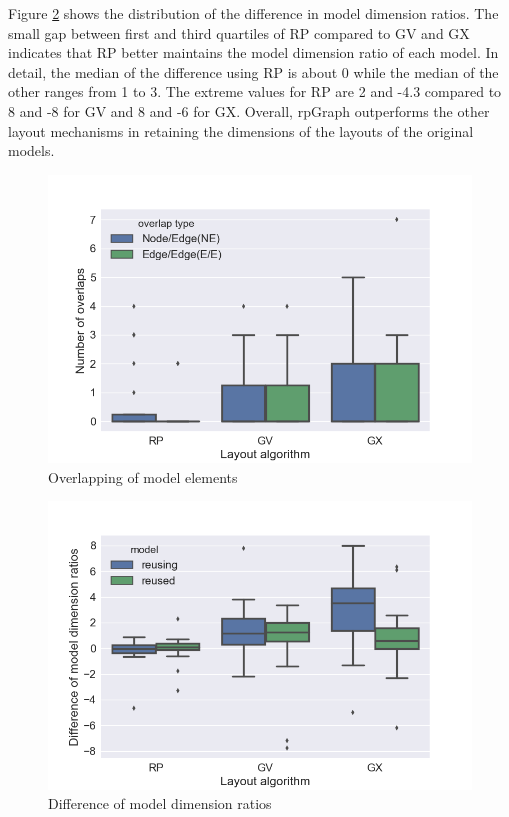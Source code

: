 Figure \ref{fig : relative dimension} shows the distribution of the difference in model dimension ratios. The small gap between first and third quartiles of RP compared to GV and GX indicates that RP better maintains the model dimension ratio of each model. In detail, the median of the difference using RP is about 0 while the median of the other ranges from 1 to 3. The extreme values for RP are 2 and -4.3 compared to 8 and -8 for GV and 8 and -6 for GX. Overall, rpGraph outperforms the other layout mechanisms in retaining the dimensions of the layouts of the original models.

\begin{figure}
\includegraphics[width=0.9\linewidth]{Evaluation/overlap.png}
	\caption{Overlapping of model elements}
	\label{fig : overlap}
\end{figure}

\begin{figure}
\includegraphics[width=0.9\linewidth]{Evaluation/relativedimension.png}
	\caption{Difference of model dimension ratios}
	\label{fig : relative dimension}
\end{figure}

